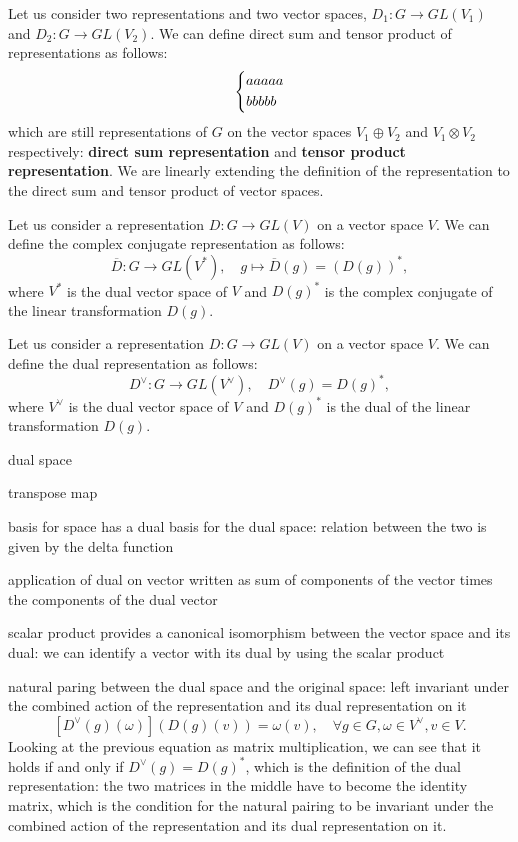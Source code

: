 \begin{definition}
    Let us consider two representations and two vector spaces, \(D_1 : G \to GL(V_1)\) and \(D_2 : G \to GL(V_2)\). We can define direct sum and tensor product of representations as follows:
    \[
        \begin{dcases}
            a a a a a \\
            b b b b b
        \end{dcases}
    \]
    which are still representations of \(G\) on the vector spaces \(V_1 \oplus V_2\) and \(V_1 \otimes V_2\) respectively: \textbf{direct sum representation} and \textbf{tensor product representation}. We are linearly extending the definition of the representation to the direct sum and tensor product of vector spaces.
\end{definition}

\begin{definition}
    Let us consider a representation \(D : G \to GL(V)\) on a vector space \(V\). We can define the complex conjugate representation as follows:
    \[
        \overline{D} : G \to GL(V^*), \quad g \mapsto \overline{D}(g) = (D(g))^*,
    \]
    where \(V^*\) is the dual vector space of \(V\) and \(D(g)^*\) is the complex conjugate of the linear transformation \(D(g)\).
\end{definition}

\begin{definition}
    Let us consider a representation \(D : G \to GL(V)\) on a vector space \(V\). We can define the dual representation as follows:
    \[
        D^\vee  : G \to GL(V^\vee), \quad D^\vee(g) = D(g)^*,
    \]
    where \(V^\vee\) is the dual vector space of \(V\) and \(D(g)^*\) is the dual of the linear transformation \(D(g)\).
\end{definition}

dual space

transpose map

basis for space has a dual basis for the dual space: relation between the two is given by the delta function

application of dual on vector written as sum of components of the vector times the components of the dual vector

scalar product provides a canonical isomorphism between the vector space and its dual: we can identify a vector with its dual by using the scalar product

natural paring between the dual space and the original space: left invariant under the combined action of the representation and its dual representation on it
\[
    [D^{\vee} (g)(\omega)](D(g)(v)) = \omega(v), \quad \forall g \in G, \omega \in V^\vee, v \in V.
\]
Looking at the previous equation as matrix multiplication, we can see that it holds if and only if \(D^\vee(g) = D(g)^*\), which is the definition of the dual representation: the two matrices in the middle have to become the identity matrix, which is the condition for the natural pairing to be invariant under the combined action of the representation and its dual representation on it.

